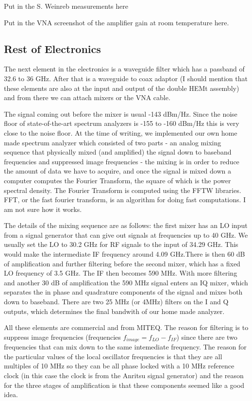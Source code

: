 \documentclass[11pt]{article}
\begin{document}
Put in the S. Weinreb measurements here

Put in the VNA screenshot of the amplifier gain at room temperature here.

\subsection{Rest of Electronics}

The next element in the electronics is a waveguide filter which has a passband of 32.6 to 36 GHz. After that is a waveguide to coax adaptor (I should mention that these elements are also at the input and output of the double HEMt assembly) and from there we can attach mixers or the VNA cable.

The signal coming out before the mixer is usual -143 dBm/Hz. Since the noise floor of state-of-the-art spectrum analyzers is -155 to -160 dBm/Hz this is very close to the noise floor. At the time of writing, we implemented our own home made spectrum analyzer which consisted of two parts - an analog mixing sequence that physically mixed (and amplified) the signal down to baseband frequencies and suppressed image frequencies - the mixing is in order to reduce the amount of data we have to acquire, and once the signal is mixed down a computer computes the Fourier Transform, the square of which is the power spectral density. The Fourier Transform is computed using the FFTW libraries. FFT, or the fast fourier transform, is an algorithm for doing fast computations. I am not sure how it works.

The details of the mixing sequence are as follows: the first mixer has an LO input from a signal generator that can give out signals at frequencies up to 40 GHz. We usually set the LO to 30.2 GHz for RF signals to the input of 34.29 GHz. This would make the intermediate IF frequency around 4.09 GHz.There is then 60 dB of amplification and further filtering before the second mixer, which has a fixed LO frequency of 3.5 GHz. The IF then becomes 590 MHz. With more filtering and another 30 dB of amplification the 590 MHz signal enters an IQ mixer, which separates the in phase and quadrature components of the signal and mixes both down to baseband. There are two 25 MHz (or 4MHz) filters on the I and Q outputs, which determines the final bandwith of our home made analyzer.

All these elements are commercial and from MITEQ. The reason for filtering is to suppress image frequencies (frequencies $f_{image} = f_{LO}-f_{IF}$) since there are two frequencies that can mix down to the same intemediate frequency. The reason for the particular values of the local oscillator frequencies is that they are all multiples of 10 MHz so they can be all phase locked with a 10 MHz reference clock (in this case the clock is from the Anritsu signal generator) and the reason for the three stages of amplification is that these components seemed like a good idea.
\end{document}
